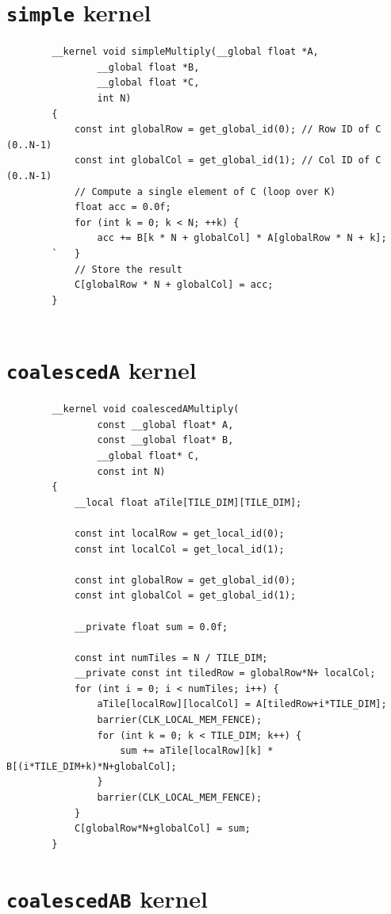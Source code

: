 \documentclass[review=false, sigchi]{acmart}
\begin{document}
	\begin{appendix}
		
		\section{\texttt{simple} kernel} \label{simpleMultiply}
		
		\begin{lstlisting}
		__kernel void simpleMultiply(__global float *A,
				__global float *B, 
				__global float *C, 
				int N)
		{
			const int globalRow = get_global_id(0); // Row ID of C (0..N-1)
			const int globalCol = get_global_id(1); // Col ID of C (0..N-1)
			// Compute a single element of C (loop over K)
			float acc = 0.0f;
			for (int k = 0; k < N; ++k) {
				acc += B[k * N + globalCol] * A[globalRow * N + k];
		`	}
			// Store the result
			C[globalRow * N + globalCol] = acc;
		}
		
		\end{lstlisting}
		
		\section{\texttt{coalescedA} kernel} \label{coalescedAMultiply}

			
		\begin{lstlisting}
		__kernel void coalescedAMultiply(
				const __global float* A,
				const __global float* B,
				__global float* C,
				const int N)
		{
			__local float aTile[TILE_DIM][TILE_DIM];
			
			const int localRow = get_local_id(0);
			const int localCol = get_local_id(1);
			
			const int globalRow = get_global_id(0);
			const int globalCol = get_global_id(1);
			
			__private float sum = 0.0f;
			
			const int numTiles = N / TILE_DIM;
			__private const int tiledRow = globalRow*N+ localCol;
			for (int i = 0; i < numTiles; i++) {
				aTile[localRow][localCol] = A[tiledRow+i*TILE_DIM];
				barrier(CLK_LOCAL_MEM_FENCE);
				for (int k = 0; k < TILE_DIM; k++) {
					sum += aTile[localRow][k] * B[(i*TILE_DIM+k)*N+globalCol];
				}
				barrier(CLK_LOCAL_MEM_FENCE);
			}
			C[globalRow*N+globalCol] = sum;
		}
		\end{lstlisting}

		
		\section{\texttt{coalescedAB} kernel} \label{coalescedABMultiply}
			

\end{appendix}
\end{document}
